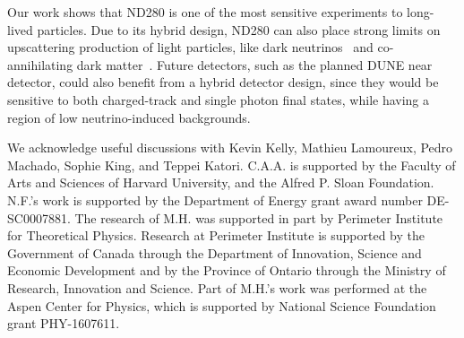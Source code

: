 \documentclass[
reprint,
superscriptaddress,
showpacs,
preprintnumbers,
bibnotes,
amsmath,
amssymb,
aps,
prd,
floatfix
]{revtex4-2}
\begin{document}
Our work shows that ND280 is one of the most sensitive experiments to long-lived particles.
Due to its hybrid design, ND280 can also place strong limits on upscattering production of light particles, like dark neutrinos~\cite{Bertuzzo:2018itn,Ballett:2018ynz,Ballett:2019pyw,upcoming} and co-annihilating dark matter~\cite{Tucker-Smith:2001myb,Izaguirre:2017bqb}.
Future detectors, such as the planned DUNE near detector, could also benefit from a hybrid detector design, since they would be sensitive to both charged-track and single photon final states, while having a region of low neutrino-induced backgrounds.

\acknowledgments
We acknowledge useful discussions with Kevin Kelly, Mathieu Lamoureux, Pedro Machado, Sophie King, and Teppei Katori.
C.A.A. is supported by the Faculty of Arts and Sciences of Harvard University, and the Alfred P. Sloan Foundation. 
N.F.’s work is supported by the Department of Energy grant award number DE-SC0007881.
The research of M.H. was supported in part by Perimeter Institute for Theoretical Physics. Research at Perimeter Institute is supported by the Government of Canada through the Department of Innovation, Science and Economic Development and by the Province of Ontario through the Ministry of Research, Innovation and Science. Part of M.H.'s work was performed at the Aspen Center for Physics, which is supported by National Science Foundation grant PHY-1607611.



{}
\end{document}
